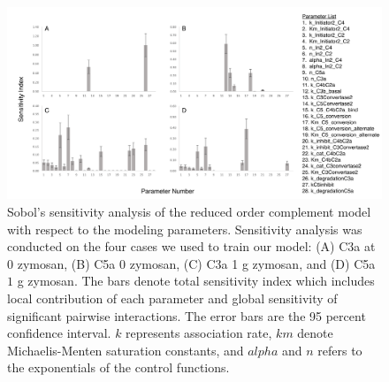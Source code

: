 \documentclass[12pt]{article}
\begin{document}
\begin{figure}[h]
\centering
\includegraphics[width=1.0\textwidth]{./figs/Figure4_Sensitivity_Analysis_v2.pdf}
\caption{Sobol's sensitivity analysis of the reduced order complement model with respect to the modeling parameters.  Sensitivity analysis was conducted on the four cases we used to train our model: (A) C3a at 0 zymosan, (B) C5a 0 zymosan, (C) C3a 1 g zymosan, and (D) C5a $1$ g zymosan. The bars denote total sensitivity index which includes local contribution of each parameter and global sensitivity of significant pairwise interactions. The error bars are the 95 percent confidence interval. $k$ represents association rate, $km$ denote Michaelis-Menten saturation constants, and $alpha$ and $n$ refers to the exponentials of the control functions.}\label{fig-SA}
\end{figure}
\end{document}

